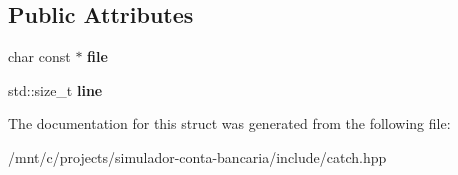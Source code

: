 \subsection*{Public Attributes}
\begin{DoxyCompactItemize}
\item 
\mbox{\label{structCatch_1_1SourceLineInfo_ad65537703e9f08c1fa7777fbc3f0c617}} 
char const  $\ast$ {\bfseries file}
\item 
\mbox{\label{structCatch_1_1SourceLineInfo_a841e5d696c7b9cde24e45e61dd979c77}} 
std\+::size\+\_\+t {\bfseries line}
\end{DoxyCompactItemize}


The documentation for this struct was generated from the following file\+:\begin{DoxyCompactItemize}
\item 
/mnt/c/projects/simulador-\/conta-\/bancaria/include/catch.\+hpp\end{DoxyCompactItemize}
